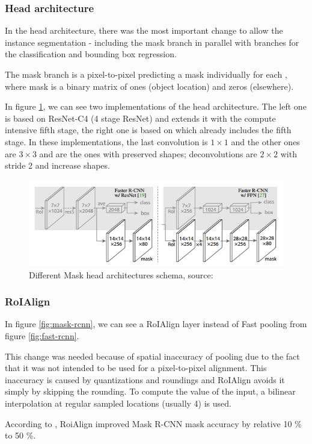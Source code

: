 \subsubsection{Head architecture}
\label{head}

In the head architecture, there was the most important change to allow the 
instance segmentation - including the mask branch in parallel with branches for 
the classification and bounding box regression. 

The mask branch is a pixel-to-pixel  predicting a mask individually for 
each , where mask is a binary matrix of ones (object location) and zeros 
(elsewhere).

In figure \ref{fig:head}, we can see two implementations of the head 
architecture. The left one is based on ResNet-C4 (4 stage ResNet) and extends it 
with the compute intensive fifth stage, the right one is based on  which 
already includes the fifth stage. In these implementations, the last convolution 
is $1 \times 1$ and the other ones are $3 \times 3$ and are the ones with 
preserved shapes; deconvolutions are $2 \times 2$ with stride 2 and increase 
shapes. 

\begin{figure}[H]
   \centering
	\includegraphics[width=0.7\linewidth]{./pictures/maskrcnn-head.png}
	\caption[Mask R-CNN head architecture]{Different Mask  head 
architectures schema, source: \cite{mask-rcnn}}
      \label{fig:head}
\end{figure}

\subsubsection{RoIAlign}
\label{roialign}

In figure \ref{fig:mask-rcnn}, we can see a RoIAlign layer instead of Fast 
  pooling from figure \ref{fig:fast-rcnn}.

This change was needed because of spatial inaccuracy of  pooling due to 
the fact that it was not intended to be used for a pixel-to-pixel alignment. 
This inaccuracy is caused by quantizations and roundings and RoIAlign avoids it 
simply by skipping the rounding. To compute the value of the input, a bilinear 
interpolation at regular sampled locations (usually 4) is used.

According to \cite{mask-rcnn}, RoiAlign improved Mask R-CNN mask accuracy by 
relative 10 \% to 50 \%.

